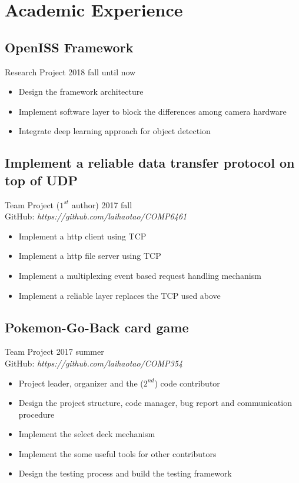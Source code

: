 \documentclass[11pt,a4paper,sans]{moderncv}
\begin{document}
\section{Academic Experience}

\subsection{OpenISS Framework}
Research Project \hfill 2018 fall until now
\begin{itemize}
	\item Design the framework architecture
	\item Implement software layer to block the differences among camera hardware
	\item Integrate deep learning approach for object detection
\end{itemize}

\subsection{Implement a reliable data transfer protocol on top of UDP}
Team Project ($1^{st}$ author) \hfill 2017 fall \\
GitHub: {\textit{https://github.com/laihaotao/COMP6461}}
\vspace{2pt}
\begin{itemize}
\item Implement a http client using TCP
\item Implement a http file server using TCP
\item Implement a multiplexing event based request handling mechanism
\item Implement a reliable layer replaces the TCP used above
\end{itemize}

\subsection{Pokemon-Go-Back card game}
Team Project \hfill 2017 summer \\
GitHub: {\textit{https://github.com/laihaotao/COMP354}}
\vspace{2pt}
\begin{itemize}
\item Project leader, organizer and the ($2^{nd}$) code contributor
\item Design the project structure, code manager, bug report and communication procedure
\item Implement the select deck mechanism
\item Implement the some useful tools for other contributors
\item Design the testing process and build the testing framework
\end{itemize}
\end{document}
